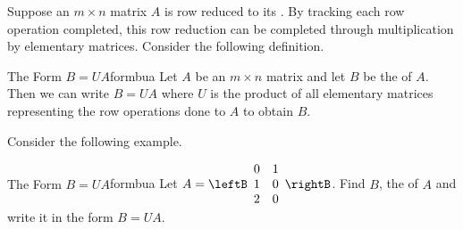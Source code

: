 Suppose an $m \times n$ matrix $A$ is row reduced to its \rref. By tracking each row operation completed, this row reduction can be completed through multiplication by elementary matrices. Consider the following definition.

\begin{definition}{The Form $B=UA$}{formbua}
Let $A$ be an $m \times n$ matrix and let $B$ be the \rref \;of $A$. Then we can write $B = UA$ where $U$ is the product of all elementary matrices representing the row operations done to $A$ to obtain $B$. 
\end{definition}

Consider the following example.

\begin{example}{The Form $B=UA$}{formbua}
Let $A = \leftB
\begin{array}{rr}
0 & 1 \\
1 & 0 \\
2 & 0
\end{array}
\rightB$. Find $B$, the \rref \;of $A$ and write it in the form $B=UA$.
\end{example}

